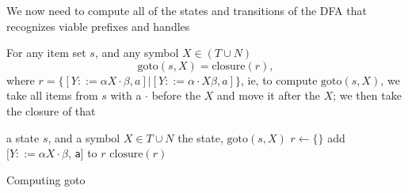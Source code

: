 \documentclass[8pt,a4paper,compress]{beamer}
\begin{document}
\begin{frame}[fragile]
\pause

We now need to compute all of the states and transitions of the DFA that recognizes viable prefixes and handles

\pause
\bigskip

For any item set $s$, and any symbol $X \in (T \cup N)$ $$\text{goto}(s, X) = \text{closure}(r),$$ where $r = \{[Y ::= \alpha X \cdot \beta, a] | [Y ::= \alpha \cdot X \beta, a]\}$, ie, to compute $\text{goto}(s,X)$, we take all items from $s$ with a $\cdot$ before the $X$ and move it after the $X$; we then take the closure of that

\pause
\bigskip

\begin{algorithm}[H]
\begin{algorithmic}
\REQUIRE a state $s$, and a symbol $X \in T \cup N$
\ENSURE the state, $\text{goto}(s, X)$
\STATE $r \gets \{\}$
\STATE add $[Y ::= \alpha X \cdot \beta$, \lstinline{a}] to $r$
\ENDFOR
\RETURN $\text{closure}(r)$
\end{algorithmic}
\caption{Computing goto}
\end{algorithm}
\end{frame}
\end{document}
